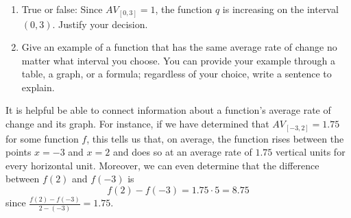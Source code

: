 \documentclass[nooutcomes]{ximera}
\begin{document}
\begin{exploration}
\begin{enumerate}[label=\alph*.]
\item True or false: Since \(AV_{[0,3]} = 1\), the function \(q\) is increasing on the interval \((0,3)\).  Justify your decision.
\item Give an example of a function that has the same average rate of change no matter what interval you choose. You can provide your example through a table, a graph, or a formula; regardless of your choice, write a sentence to explain.
\end{enumerate}

\end{exploration}

It is helpful be able to connect information about a function's average rate of change and its graph.  For instance, if we have determined that \(AV_{[-3,2]} = 1.75\) for some function \(f\), this tells us that, on average, the function rises between the points \(x = -3\) and \(x = 2\) and does so at an average rate of \(1.75\) vertical units for every horizontal unit.  Moreover, we can even determine that the difference between \(f(2)\) and \(f(-3)\) is%
\begin{equation*}
f(2)-f(-3) = 1.75 \cdot 5 = 8.75
\end{equation*}
since \(\frac{f(2)-f(-3)}{2-(-3)} = 1.75\).
\end{document}
